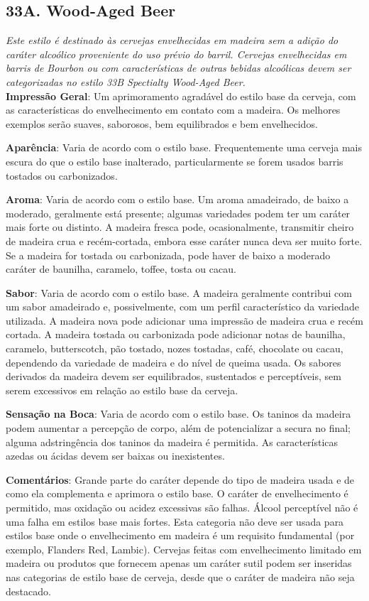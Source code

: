 \subsection*{33A. Wood-Aged Beer}
\textit{Este estilo é destinado às cervejas envelhecidas em madeira sem a adição do caráter alcoólico proveniente do uso prévio do barril. Cervejas envelhecidas em barris de Bourbon ou com características de outras bebidas alcoólicas devem ser categorizadas no estilo 33B Spectialty Wood-Aged Beer.}\\
\textbf{Impressão Geral}: Um aprimoramento agradável do estilo base da cerveja, com as características do envelhecimento em contato com a madeira. Os melhores exemplos serão suaves, saborosos, bem equilibrados e bem envelhecidos.

\textbf{Aparência}: Varia de acordo com o estilo base. Frequentemente uma cerveja mais escura do que o estilo base inalterado, particularmente se forem usados barris tostados ou carbonizados.

\textbf{Aroma}: Varia de acordo com o estilo base. Um aroma amadeirado, de baixo a moderado, geralmente está presente; algumas variedades podem ter um caráter mais forte ou distinto. A madeira fresca pode, ocasionalmente, transmitir cheiro de madeira crua e recém-cortada, embora esse caráter nunca deva ser muito forte. Se a madeira for tostada ou carbonizada, pode haver de baixo a moderado caráter de baunilha, caramelo, toffee, tosta ou cacau.

\textbf{Sabor}: Varia de acordo com o estilo base. A madeira geralmente contribui com um sabor amadeirado e, possivelmente, com um perfil característico da variedade utilizada. A madeira nova pode adicionar uma impressão de madeira crua e recém cortada. A madeira tostada ou carbonizada pode adicionar notas de baunilha, caramelo, butterscotch, pão tostado, nozes tostadas, café, chocolate ou cacau, dependendo da variedade de madeira e do nível de queima usada. Os sabores derivados da madeira devem ser equilibrados, sustentados e perceptíveis, sem serem excessivos em relação ao estilo base da cerveja.

\textbf{Sensação na Boca}: Varia de acordo com o estilo base. Os taninos da madeira podem aumentar a percepção de corpo, além de potencializar a secura no final; alguma adstringência dos taninos da madeira é permitida. As características azedas ou ácidas devem ser baixas ou inexistentes.

\textbf{Comentários}: Grande parte do caráter depende do tipo de madeira usada e de como ela complementa e aprimora o estilo base. O caráter de envelhecimento é permitido, mas oxidação ou acidez excessivas são falhas. Álcool perceptível não é uma falha em estilos base mais fortes. Esta categoria não deve ser usada para estilos base onde o envelhecimento em madeira é um requisito fundamental (por exemplo, Flanders Red, Lambic). Cervejas feitas com envelhecimento limitado em madeira ou produtos que fornecem apenas um caráter sutil podem ser inseridas nas categorias de estilo base de cerveja, desde que o caráter de madeira não seja destacado.

